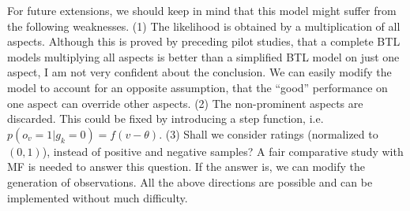 \documentclass[11pt]{report}
\begin{document}
For future extensions, we should keep in mind that this model might suffer from the following weaknesses. (1) The likelihood is obtained by a multiplication of all aspects. Although this is proved by preceding pilot studies, that a complete BTL models multiplying all aspects is better than a simplified BTL model on just one aspect, I am not very confident about the conclusion. We can easily modify the model to account for an opposite assumption, that the ``good'' performance on one aspect can override other aspects.  (2) The non-prominent aspects are discarded. This could be fixed by introducing a step function, i.e. $p(o_v=1|g_k=0)=f(v-\theta)$.  (3)  Shall we consider ratings (normalized to $(0,1)$), instead of positive and negative samples? A fair comparative study with MF is needed to answer this question.  If the answer is, we can modify the generation of observations. All the above directions are possible and can be implemented without much difficulty.
 
\end{document}
